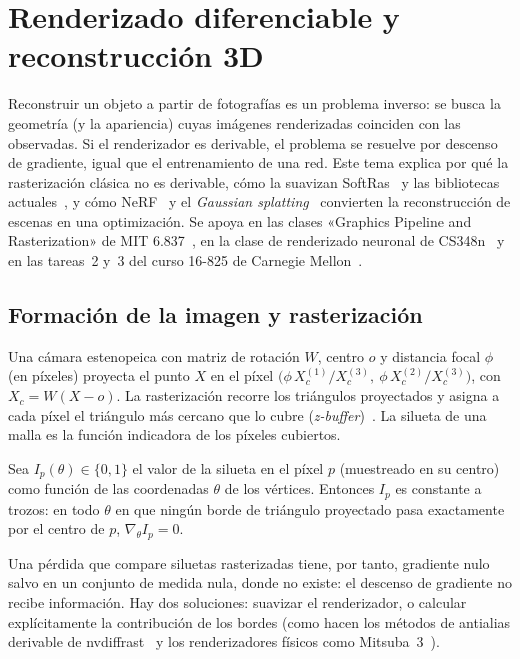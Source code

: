 \chapter{Renderizado diferenciable y reconstrucción 3D}
\label{tema:4}

Reconstruir un objeto a partir de fotografías es un problema inverso: se busca la geometría (y la apariencia) cuyas imágenes renderizadas coinciden con las observadas. Si el renderizador es derivable, el problema se resuelve por descenso de gradiente, igual que el entrenamiento de una red. Este tema explica por qué la rasterización clásica no es derivable, cómo la suavizan SoftRas~\cite{softras} y las bibliotecas actuales~\cite{pytorch3d,nvdiffrast,mitsuba3}, y cómo NeRF~\cite{nerf} y el \emph{Gaussian splatting}~\cite{gs} convierten la reconstrucción de escenas en una optimización. Se apoya en las clases «Graphics Pipeline and Rasterization» de MIT 6.837~\cite{mit6837}, en la clase de renderizado neuronal de CS348n~\cite{cs348n} y en las tareas~2 y~3 del curso 16-825 de Carnegie Mellon~\cite{cmu16825}.

\section{Formación de la imagen y rasterización}

Una cámara estenopeica con matriz de rotación $W$, centro $o$ y distancia focal $\phi$ (en píxeles) proyecta el punto $X$ en el píxel $\bigl(\phi\,X_c^{(1)}/X_c^{(3)},\ \phi\,X_c^{(2)}/X_c^{(3)}\bigr)$, con $X_c=W(X-o)$. La rasterización recorre los triángulos proyectados y asigna a cada píxel el triángulo más cercano que lo cubre (\emph{z-buffer})~\cite{mit6837}. La silueta de una malla es la función indicadora de los píxeles cubiertos.

\begin{proposicion}\label{prop:grad-cero}
Sea $I_p(\theta)\in\{0,1\}$ el valor de la silueta en el píxel $p$ (muestreado en su centro) como función de las coordenadas $\theta$ de los vértices. Entonces $I_p$ es constante a trozos: en todo $\theta$ en que ningún borde de triángulo proyectado pasa exactamente por el centro de $p$, $\nabla_\theta I_p=0$.
\end{proposicion}

Una pérdida que compare siluetas rasterizadas tiene, por tanto, gradiente nulo salvo en un conjunto de medida nula, donde no existe: el descenso de gradiente no recibe información. Hay dos soluciones: suavizar el renderizador, o calcular explícitamente la contribución de los bordes (como hacen los métodos de antialias derivable de nvdiffrast~\cite{nvdiffrast} y los renderizadores físicos como Mitsuba~3~\cite{mitsuba3}).

